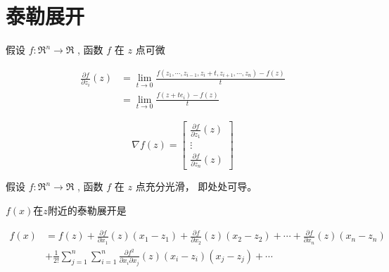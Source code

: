 \section{泰勒展开}

\begin{definition}[函数$f$第$i$个分量的一阶偏导数]
    假设 $ f: \mathfrak{R}^{n} \rightarrow \mathfrak{R} $ , 函数 $ f $ 在 $ z $ 点可微

    \begin{equation} \begin{aligned} \frac{\partial f}{\partial z_{i}}(z) &=\lim _{t \rightarrow 0} \frac{f\left(z_{1}, \cdots, z_{i-1}, z_{i}+t, z_{i+1}, \cdots, z_{n}\right)-f(z)}{t} \\ &=\lim _{t \rightarrow 0} \frac{f\left(z+t e_{i}\right)-f(z)}{t} \end{aligned} \end{equation}
\end{definition}

\begin{definition}[$f$在点$z$的梯度]
    \begin{equation} \nabla f(z)=\left[\begin{array}{c}\frac{\partial f}{\partial z_{1}}(z) \\ \vdots \\ \frac{\partial f}{\partial z_{n}}(z)\end{array}\right] \end{equation}
\end{definition}

\begin{definition}
    假设 $ f: \mathfrak{R}^{n} \rightarrow \mathfrak{R} $ , 函数 $ f $ 在 $ z $ 点充分光滑， 即处处可导。

    $f(x)$在$z$附近的泰勒展开是

    \begin{equation}\begin{aligned} f(x)&=f(z)+\frac{\partial f}{\partial x_{1}}(z)\left(x_{1}-z_{1}\right)+\frac{\partial f}{\partial x_{2}}(z)\left(x_{2}-z_{2}\right)+\cdots+\frac{\partial f}{\partial x_{n}}(z)\left(x_{n}-z_{n}\right) 
    \\ & +\frac{1}{2 !} \sum_{j=1}^{n} \sum_{i=1}^{n} \frac{\partial f^{2}}{\partial x_{i} \partial x_{j}}(z)\left(x_{i}-z_{i}\right)\left(x_{{j}}-z_{j}\right)+\cdots \end{aligned}\end{equation}
\end{definition}


